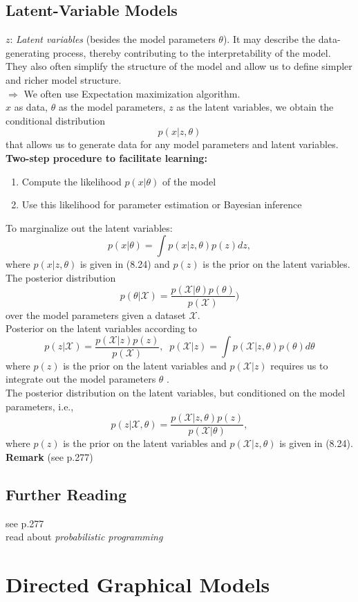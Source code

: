 \subsection{Latent-Variable Models}
$z$: \textit{Latent variables} (besides the model parameters $\theta$). It may describe the data-generating process, thereby contributing to the interpretability of the model. They also often simplify the structure of the model and allow us to define simpler and richer model structure. \\
$\Rightarrow$ We often use Expectation maximization algorithm. \\ 
$x$ as data, $\theta$ as the model parameters, $z$ as the latent variables, we obtain the conditional distribution 
\[
p(x|z,\theta) \tag{8.24}
\]
that allows us to generate data for any model parameters and latent variables. \\
\textbf{Two-step procedure to facilitate learning:}
\begin{enumerate}
	\item Compute the likelihood $p(x|\theta)$ of the model
	\item Use this likelihood for parameter estimation or Bayesian inference
\end{enumerate}
To marginalize out the latent variables:
\[
p(x|\theta) = \int p(x|z, \theta) p(z) dz, \tag{8.25}
\]
where $p(x|z, \theta)$ is given in (8.24) and $p(z)$ is the prior on the latent variables.\\
The posterior distribution 
\[
p(\theta | \mathcal{X}) = \frac{p(\mathcal{X} | \theta) p(\theta)}{p(\mathcal{X})}) \tag{8.26} 
\]
over the model parameters given a dataset $\mathcal{X}$.\\
Posterior on the latent variables according to
\[
p(z|\mathcal{X}) = \frac{p(\mathcal{X} | z) p(z)}{p(\mathcal{X})}, \; \; p(\mathcal{X} | z) = \int p(\mathcal{X} | z, \theta) p(\theta) d\theta \tag{8.27}
\]
where $p(z)$ is the prior on the latent variables and $p(\mathcal{X} | z)$ requires us to
integrate out the model parameters $\theta$ . \\
The posterior distribution on the latent variables, but conditioned on the model parameters, i.e.,
\[
p(z|\mathcal{X}, \theta) = \frac{p(\mathcal{X}| z, \theta) p(z)}{p(\mathcal{X} | \theta)}, \tag{8.28}
\]
where $p(z)$ is the prior on the latent variables and $p(\mathcal{X} | z, \theta)$ is given
in (8.24). \\
\textbf{Remark} (see p.277)

\subsection{Further Reading}
see p.277\\
read about \textit{probabilistic programming}

\section{Directed Graphical Models}